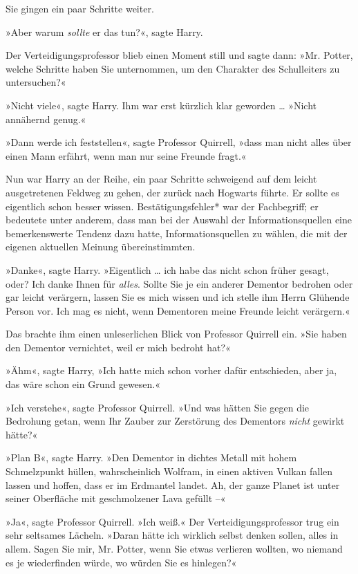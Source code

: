 {Sie gingen ein paar Schritte weiter.

»Aber warum \emph{sollte} er das tun?«, sagte Harry.

Der Verteidigungsprofessor blieb einen Moment still und sagte dann: »Mr. Potter, welche Schritte haben Sie unternommen, um den Charakter des Schulleiters zu untersuchen?«

»Nicht viele«, sagte Harry. Ihm war erst kürzlich klar geworden … »Nicht annähernd genug.«

»Dann werde ich feststellen«, sagte Professor Quirrell, »dass man nicht alles über einen Mann erfährt, wenn man nur seine Freunde fragt.«

Nun war Harry an der Reihe, ein paar Schritte schweigend auf dem leicht ausgetretenen Feldweg zu gehen, der zurück nach Hogwarts führte. Er sollte es eigentlich schon besser wissen. Bestätigungsfehler* war der Fachbegriff; er bedeutete unter anderem, dass man bei der Auswahl der Informationsquellen eine bemerkenswerte Tendenz dazu hatte, Informationsquellen zu wählen, die mit der eigenen aktuellen Meinung übereinstimmten.

»Danke«, sagte Harry. »Eigentlich … ich habe das nicht schon früher gesagt, oder? Ich danke Ihnen für \emph{alles}. Sollte Sie je ein anderer Dementor bedrohen oder gar leicht verärgern, lassen Sie es mich wissen und ich stelle ihm Herrn Glühende Person vor. Ich mag es nicht, wenn Dementoren meine Freunde leicht verärgern.«

Das brachte ihm einen unleserlichen Blick von Professor Quirrell ein. »Sie haben den Dementor vernichtet, weil er mich bedroht hat?«

»Ähm«, sagte Harry, »Ich hatte mich schon vorher dafür entschieden, aber ja, das wäre schon ein Grund gewesen.«

»Ich verstehe«, sagte Professor Quirrell. »Und was hätten Sie gegen die Bedrohung getan, wenn Ihr Zauber zur Zerstörung des Dementors \emph{nicht} gewirkt hätte?«

»Plan B«, sagte Harry. »Den Dementor in dichtes Metall mit hohem Schmelzpunkt hüllen, wahrscheinlich Wolfram, in einen aktiven Vulkan fallen lassen und hoffen, dass er im Erdmantel landet. Ah, der ganze Planet ist unter seiner Oberfläche mit geschmolzener Lava gefüllt --«

»Ja«, sagte Professor Quirrell. »Ich weiß.« Der Verteidigungsprofessor trug ein sehr seltsames Lächeln. »Daran hätte ich wirklich selbst denken sollen, alles in allem. Sagen Sie mir, Mr. Potter, wenn Sie etwas verlieren wollten, wo niemand es je wiederfinden würde, wo würden Sie es hinlegen?«

}
